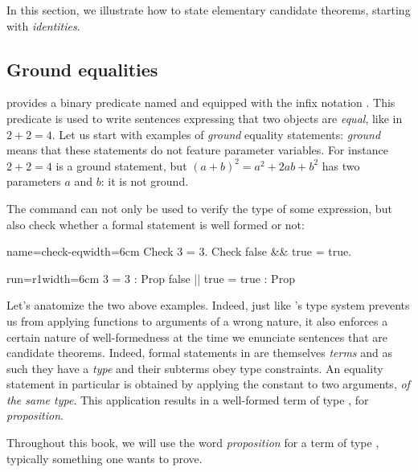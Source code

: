 In this section, we illustrate how to state elementary candidate
theorems, starting with \emph{identities}.

\subsection{Ground equalities}\label{ssec:groundeq}

\Coq{} provides a binary predicate named  and equipped with the
infix notation \C{=}. This predicate is used to write sentences
expressing that two objects are \emph{equal}, like in $2 + 2 = 4$.
Let us start with examples of \Coq{} \emph{ground} equality
statements: \emph{ground} means that these statements do not feature
parameter variables. For instance $2 + 2 = 4$ is a ground
statement, but $(a + b)^2 = a^2 + 2ab + b^2$ has two parameters $a$
and $b$: it is not ground.

The  command can not only be used to verify the type
of some expression, but also check whether a formal statement
is well formed or not:

\begin{coq}{name=check-eq}{width=6cm}
Check 3 = 3.
Check false && true = true.
\end{coq}
\begin{coqout}{run=r1}{width=6cm}
3 = 3 : Prop
false || true = true : Prop
\end{coqout}

Let's anatomize the two above examples. Indeed, just like \Coq{}'s
type system prevents us from applying functions to
arguments of a wrong nature, it also enforces a certain nature of
well-formedness at the time we enunciate sentences that are candidate
theorems. Indeed, formal statements in \Coq{} are themselves
\emph{terms} and as such they have a \emph{type} and their subterms
obey type constraints. An
equality statement in particular is obtained by applying the constant
 to two arguments, \emph{of the same type}. This application
results in a well-formed term of type , for \emph{proposition}.

Throughout this book, we will
use the word \emph{proposition} for a term of type , typically
something one wants to prove.

